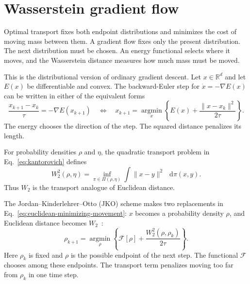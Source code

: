 \documentclass[11pt]{article}
\newcommand{\R}{\mathbb{R}}
\newcommand{\dd}{\mathop{}\!\mathrm{d}}
\begin{document}
\section{Wasserstein gradient flow}

Optimal transport fixes both endpoint distributions and minimizes the cost of
moving mass between them. A gradient flow fixes only the present distribution.
The next distribution must be chosen. An energy functional selects where it
moves, and the Wasserstein distance measures how much mass must be moved.

This is the distributional version of ordinary gradient descent. Let
$x\in\R^d$ and let $E(x)$ be differentiable and convex. The backward-Euler
step for $\dot x=-\nabla E(x)$ can be written in either of the equivalent
forms
\begin{equation}
  \frac{x_{k+1}-x_k}{\tau}=-\nabla E(x_{k+1})
  \quad\Longleftrightarrow\quad
  x_{k+1}
  =\operatorname*{argmin}_{x}
  \left\{
    E(x)+\frac{\lVert x-x_k\rVert^2}{2\tau}
  \right\}.
  \label{eq:euclidean-minimizing-movement}
\end{equation}
The energy chooses the direction of the step. The squared distance penalizes
its length.

For probability densities $\rho$ and $\eta$, the quadratic transport problem
in Eq.~\eqref{eq:kantorovich} defines
\begin{equation}
  W_2^2(\rho,\eta)
  =\inf_{\pi\in\Pi(\rho,\eta)}
   \int\lVert x-y\rVert^2\,\dd\pi(x,y).
  \label{eq:wasserstein-two}
\end{equation}
Thus $W_2$ is the transport analogue of Euclidean distance.

The Jordan--Kinderlehrer--Otto (JKO) scheme makes two replacements in
Eq.~\eqref{eq:euclidean-minimizing-movement}: $x$ becomes a probability
density $\rho$, and Euclidean distance becomes $W_2$~\cite{jko-1998}:
\begin{equation}
  \rho_{k+1}
  =\operatorname*{argmin}_{\rho}
  \left\{
    \mathcal F[\rho]
    +\frac{W_2^2(\rho,\rho_k)}{2\tau}
  \right\}.
  \label{eq:jko-step}
\end{equation}
Here $\rho_k$ is fixed and $\rho$ is the possible endpoint of the next step.
The functional $\mathcal F$ chooses among these endpoints. The transport term
penalizes moving too far from $\rho_k$ in one time step.
\end{document}

